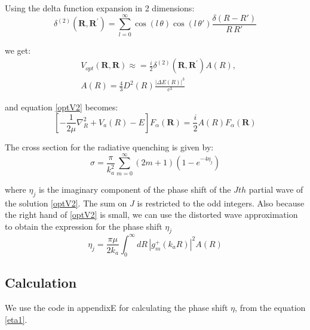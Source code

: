 Using the delta function expansion in 2 dimensions: 
\begin{equation}
\delta^{(2)}\left(\mathbf{R},\mathbf{R}^{'}\right) = \sum_{l=0}^{\infty}{\cos(l\,\theta)\cos(l\,\theta')\frac{\delta(R - R')}{R\,R'}}
\end{equation}

we get:
\begin{equation}
\begin{split}
    & V_{opt}(\mathbf{R},\mathbf{R}) \approx = \frac{i}{2}\delta^{(2)}\left(\mathbf{R},\mathbf{R}^{'}\right)A(R), \\[.8em]
& A(R) = \frac{4}{3}D^2(R)\frac{\left|\Delta E(R)\right|^3}{c^3}
\end{split}
\end{equation}

and equation \eqref{optV2} becomes:
\begin{equation}\label{optApprox1}
\left[-\frac{1}{2\mu}\nabla_R^2 + V_a(R) - E\right]F_{\alpha}(\mathbf{R}) = \frac{i}{2}A(R)F_{\alpha}(\mathbf{R})
\end{equation}

The cross section for the radiative quenching is given by:
\begin{equation}
\sigma = \frac{\pi}{k_a^2}\sum_{m=0}^{\infty}{(2m+1)\left(1-e^{-4\eta_j}\right) }
\end{equation}

where $ \eta_j $ is the imaginary component of the phase shift of the $ Jth $ partial wave of the solution \eqref{optV2}. The sum on $ J $ is restricted to the odd integers. 
Also because the right hand of \eqref{optV2} is small, we can use the distorted wave approximation to obtain the expression for the phase shift $ \eta_j $
\begin{equation}\label{eta1}
\eta_j = \frac{\pi\mu}{2k_a}\int_0^{\infty}{dR\,\left|g_m^{+}\left(k_aR\right)\right|^2A(R) }
\end{equation}

\subsection{Calculation} \label{QuenchingCalculation}

We use the code in appendixE for calculating the phase shift $ \eta $, from the equation \eqref{eta1}.

